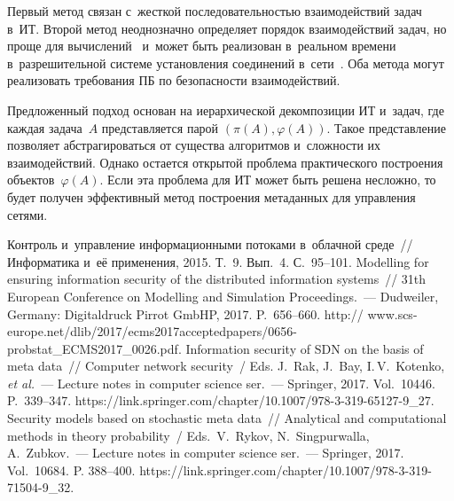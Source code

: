 \begin{multicols}{2}
Первый метод связан с~жест\-кой последовательностью 
взаимодействий задач в~ИТ. 
Второй метод неоднозначно определяет порядок 
взаимодействий задач, но проще для вы\-чис\-ле\-ний~\cite{3-gr} и~может быть 
реализован в~реальном времени в~разрешительной сис\-те\-ме установления 
соединений в~сети~\cite{1-gr}. Оба метода могут реализовать требования ПБ по 
безопасности взаимодействий. 

Предложенный подход основан на иерархической 
декомпозиции ИТ и~задач, где каж\-дая задача~$A$ 
пред\-став\-ля\-ет\-ся парой $(\pi (A), \varphi (A))$. Такое пред\-став\-ле\-ние поз\-во\-ля\-ет 
абстрагироваться от существа алгоритмов и~слож\-ности их взаимодействий. 
Однако остается открытой проб\-ле\-ма практического по\-стро\-ения 
объектов~$\varphi(A)$. Если эта проблема для ИТ может быть решена не\-слож\-но, 
то будет получен эффективный метод по\-стро\-ения метаданных для управ\-ле\-ния 
сетями.
{ %

}

  
{\small\frenchspacing
 {%
 \begin{thebibliography}{9}
 
 Контроль и~управ\-ле\-ние информационными 
потоками в~облачной среде~// Информатика и~её применения, 2015. Т.~9. Вып.~4. С.~95--101.
 Modelling for ensuring information security of 
the distributed information systems~// 
31th European Conference on Modelling and Simulation 
Proceedings.~--- Dudweiler, Germany: Digitaldruck Pirrot GmbHP, 
2017. P.~656--660.
{\sf http:// www.scs-europe.net/dlib/2017/ecms2017acceptedpapers/0656-probstat\_ECMS2017\_0026.pdf}.
 Information security of SDN 
on the basis of
 meta data~// Computer network security~/
Eds. J.~Rak, J.~Bay, I.\,V.~Kotenko, \textit{et al.}~---
Lecture notes in computer science ser.~--- Springer, 2017. Vol.~10446. P.~339--347.
{\sf https://link.springer.com/chapter/10.1007/978-3-319-65127-9\_27}.
Security models based on stochastic meta data~// Analytical and computational
methods in theory probability~/
Eds.\ V.~Rykov, N.~Singpurwalla, A.~Zubkov.~--- Lecture 
notes in computer science ser.~--- Springer, 2017. Vol.~10684. P. 388--400. 
 {\sf 
https://link.springer.com/chapter/10.1007/978-3-319-71504-9\_32}.


\end{thebibliography}}}
\end{multicols}
